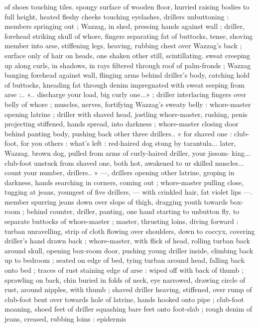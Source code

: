 of shoes touching tiles. spongy surface of wooden floor, hurried
raising bodies to full height, heated fleshy cheeks touching
eyelashes, drillers unbuttoning : members springing out ; Wazzag, in
shed, pressing hands against wall ; driller, forehead striking skull of
whore, fingers separating fat of buttocks, tense, shoving member
into arse, stiffening legs, heaving, rubbing chest over Wazzag's back
; surface only of hair on heads, one shaken other still, scintillating.
sweat creeping up along curls, in shadows, in rays filtered through
roof of palm-fronds ; Wazzag banging forehead against wall, flinging
arms behind driller’s body, catching hold of buttocks, kneading fat
through denim impregnated with sweat seeping from arse :.. «..
discharge your load, big curly one...» ; driller interlacing fingers over
belly of whore ; muscles, nerves, fortifying Wazzag's sweaty belly :
whore-master opening latrine ; driller with shaved head, jostling
whore-master, rushing, penis projecting stiffened, hands spread, into
darkness ; whore-master closing door behind panting body, pushing
back other three drillers.. « for shaved one : club-foot, for you others
: what's left : red-haired dog stung by tarantula... later, Wazzag.
brown dog, pulled from arms of curly-haired driller, your jissom-
king... club-foot unstuck from shaved one, both hot, awakened to
ur skilled muscles... count your number, drillers.. » ---, drillers
opening other latrine, groping in darkness, hands searching in
corners, coming out ; whore-master pulling close, tugging at jeans,
youngest of five drillers, --- with crinkled hair, fat violet lips ---.
member spurring jeans down over slope of thigh, dragging youth
towards box-room ; behind counter, driller, panting, one hand
starting to unbutton fly, to separate buttocks of whore-master ;
master, thrusting loins, diving forward : turban unravelling, strip of
cloth flowing over shoulders, down to coccyx, covering driller's hand
drawn back ; whore-master, with flick of head, rolling turban back
around skull, opening box-room door, pushing young driller inside,
climbing back up to bedroom ; seated on edge of bed, tying turban
around head, falling back onto bed ; traces of rust staining edge of
arse : wiped off with back of thumb ; sprawling on back, chin buried
in folds of neck, eye narrowed, drawing circle of rust, around
nipples, with thumb ; shaved driller heaving, stiffened, over rump of
club-foot bent over towards hole of latrine, hands hooked onto pipe
; club-foot moaning, shoed feet of driller squashing bare feet onto
foot-slab ; rough denim of jeans, creased, rubbing loins : epidermis

